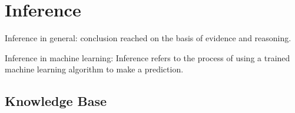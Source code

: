 \chapter{Inference}

Inference in general: conclusion reached on the basis of evidence and reasoning.

Inference in machine learning: Inference refers to the process of using a trained machine learning algorithm to make a prediction.

\section{Knowledge Base}